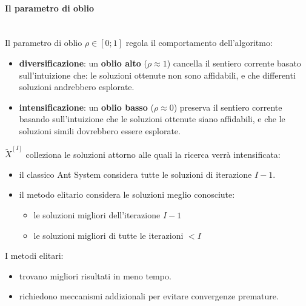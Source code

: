 \documentclass{article}
\begin{document}
\paragraph{Il parametro di oblio}\mbox{}\\
Il parametro di oblio $\rho\in[0;1]$ regola il comportamento dell'algoritmo:
\begin{itemize}
    \item \textbf{diversificazione}: un \textbf{oblio alto} ($\rho\approx 1$) cancella
          il sentiero corrente basato sull'intuizione che: le soluzioni ottenute non sono affidabili, e che
          differenti soluzioni andrebbero esplorate.
    \item \textbf{intensificazione}: un \textbf{oblio basso} ($\rho\approx 0$) preserva il sentiero
          corrente basando sull'intuizione che le soluzioni ottenute siano affidabili, e che le soluzioni simili
          dovrebbero essere esplorate.
\end{itemize}
$\tilde{X}^{[I]}$ colleziona le soluzioni attorno alle quali la ricerca verrà intensificata:
\begin{itemize}
    \item il classico Ant System considera tutte le soluzioni di iterazione $I-1$.
    \item il metodo elitario considera le soluzioni meglio conosciute:
          \begin{itemize}
              \item le soluzioni migliori dell'iterazione $I-1$
              \item le soluzioni migliori di tutte le iterazioni $<I$
          \end{itemize}
\end{itemize}
I metodi elitari:
\begin{itemize}
    \item trovano migliori risultati in meno tempo.
    \item richiedono meccanismi addizionali per evitare convergenze premature.
\end{itemize}
\end{document}
